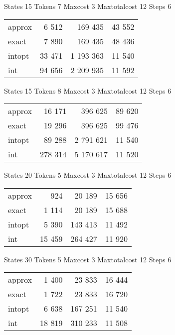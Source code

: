 \documentclass[a4paper,11pt]{article}
\begin{document}
\begin{table}
States 15 Tokens 7 Maxcost 3 Maxtotalcost 12 Steps 6 \\
\begin{tabular}{l r r r}
approx & 6 512 & 169 435 & 43 552 \\
exact & 7 890 & 169 435 & 48 436 \\
intopt & 33 471 & 1 193 363 & 11 540 \\
int & 94 656 & 2 209 935 & 11 592 \\
\end{tabular}
\end{table}

\begin{table}
States 15 Tokens 8 Maxcost 3 Maxtotalcost 12 Steps 6 \\
\begin{tabular}{l r r r}
approx & 16 171 & 396 625 & 89 620 \\
exact & 19 296 & 396 625 & 99 476 \\
intopt & 89 288 & 2 791 621 & 11 540 \\
int & 278 314 & 5 170 617 & 11 520 \\
\end{tabular}
\end{table}

\begin{table}
States 20 Tokens 5 Maxcost 3 Maxtotalcost 12 Steps 6 \\
\begin{tabular}{l r r r}
approx & 924 & 20 189 & 15 656 \\
exact & 1 114 & 20 189 & 15 688 \\
intopt & 5 390 & 143 413 & 11 492 \\
int & 15 459 & 264 427 & 11 920 \\
\end{tabular}
\end{table}

\begin{table}
States 30 Tokens 5 Maxcost 3 Maxtotalcost 12 Steps 6 \\
\begin{tabular}{l r r r}
approx & 1 400 & 23 833 & 16 444 \\
exact & 1 722 & 23 833 & 16 720 \\
intopt & 6 638 & 167 251 & 11 540 \\
int & 18 819 & 310 233 & 11 508 \\
\end{tabular}
\end{table}
\end{document}

